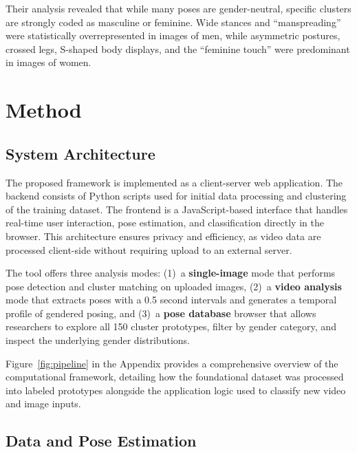 \documentclass[12pt, a4paper]{article}
\begin{document}
Their analysis revealed that while many poses are gender-neutral, specific clusters are strongly coded as masculine or feminine. Wide stances and ``manspreading'' were statistically overrepresented in images of men, while asymmetric postures, crossed legs, S-shaped body displays, and the ``feminine touch'' were predominant in images of women.


\section{Method}
\label{sec:method}

\subsection{System Architecture}
\label{sec:architecture}

The proposed framework is implemented as a client-server web application. The backend consists of Python scripts used for initial data processing and clustering of the training dataset. The frontend is a JavaScript-based interface that handles real-time user interaction, pose estimation, and classification directly in the browser. This architecture ensures privacy and efficiency, as video data are processed client-side without requiring upload to an external server. 

The tool offers three analysis modes: (1)~a \textbf{single-image} mode that performs pose detection and cluster matching on uploaded images, (2)~a \textbf{video analysis} mode that extracts poses with a 0.5 second intervals and generates a temporal profile of gendered posing, and (3)~a \textbf{pose database} browser that allows researchers to explore all 150 cluster prototypes, filter by gender category, and inspect the underlying gender distributions.

Figure~\ref{fig:pipeline} in the Appendix provides a comprehensive overview of the computational framework, detailing how the foundational dataset was processed into labeled prototypes alongside the application logic used to classify new video and image inputs.


\subsection{Data and Pose Estimation}
\label{sec:pose_estimation}
\end{document}
